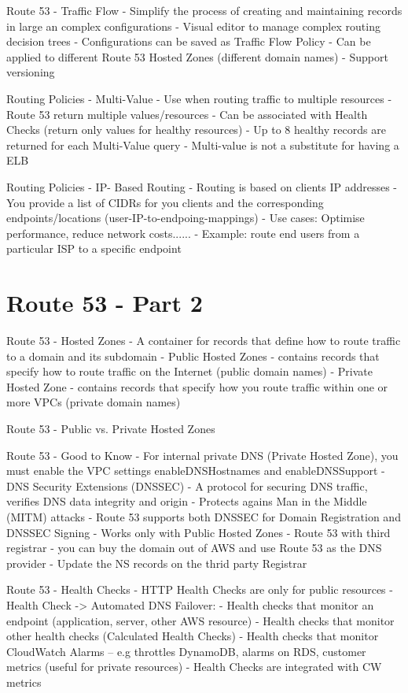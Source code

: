 
Route 53 - Traffic Flow
- Simplify the process of creating and maintaining records in large an complex configurations
- Visual editor to manage complex routing decision trees
- Configurations can be saved as Traffic Flow Policy
- Can be applied to different Route 53 Hosted Zones (different domain names)
- Support versioning

Routing Policies - Multi-Value
- Use when routing traffic to multiple resources
- Route 53 return multiple values/resources
- Can be associated with Health Checks (return only values for healthy resources)
- Up to 8 healthy records are returned for each Multi-Value query
- Multi-value is not a substitute for having a ELB

Routing Policies - IP- Based Routing
- Routing is based on clients IP addresses
- You provide a list of CIDRs for you clients and the corresponding endpoints/locations (user-IP-to-endpoing-mappings)
- Use cases: Optimise performance, reduce network costs......
- Example: route end users from a particular ISP to a specific endpoint


\section{Route 53 - Part 2}
Route 53 - Hosted Zones
- A container for records that define how to route traffic to a domain and its subdomain
- Public Hosted Zones - contains records that specify how to route traffic on the Internet (public domain names)
- Private Hosted Zone - contains records that specify how you route traffic within one or more VPCs (private domain names)

Route 53 - Public vs. Private Hosted Zones

Route 53 - Good to Know
- For internal private DNS (Private Hosted Zone), you must enable the VPC settings enableDNSHostnames and enableDNSSupport
- DNS Security Extensions (DNSSEC)
- A protocol for securing DNS traffic, verifies DNS data integrity and origin
- Protects agains Man in the Middle (MITM) attacks
- Route 53 supports both DNSSEC for Domain Registration and DNSSEC Signing
- Works only with Public Hosted Zones
- Route 53 with third registrar
- you can buy the domain out of AWS and use Route 53 as the DNS provider
- Update the NS records on the thrid party Registrar

Route 53 - Health Checks
- HTTP Health Checks are only for public resources
- Health Check -> Automated DNS Failover:
- Health checks that monitor an endpoint (application, server, other AWS resource)
- Health checks that monitor other health checks (Calculated Health Checks)
- Health checks that monitor CloudWatch Alarms -- e.g throttles DynamoDB, alarms on RDS, customer metrics (useful for private resources)
- Health Checks are integrated with CW metrics

